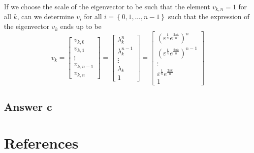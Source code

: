 \documentclass{article}
\theoremstyle{remark}
\begin{document}
    If we choose the scale of the eigenvector to be such that the element $v_{k,n} = 1$ for all $k$,  can we determine $v_{i}$ for all $i = \left\{ 0,1, \ldots, n-1 \right\}$ such that the expression of the eigenvector $v_k$ ends up to be \[
    v_k=  \begin{bmatrix} 
      v_{k,0} \\
      v_{k,1} \\
      \vdots  \\
      v_{k,n-1} \\
      v_{k,n} 
      \end{bmatrix} 
      = \begin{bmatrix} 
        \lambda_k ^{n} \\
        \lambda_k ^{n-1} \\
        \vdots  \\
        \lambda _k \\
        1
      \end{bmatrix} 
      = \begin{bmatrix} 
      \left( \varepsilon ^{\frac{1}{n}} e^{\frac{2 \pi k}{n} } \right)^{n} \\
      \left( \varepsilon ^{\frac{1}{n}} e^{\frac{2 \pi k}{n} } \right)^{n-1} \\
      \vdots \\
\varepsilon ^{\frac{1}{n}} e^{\frac{2 \pi k}{n} } \\
      1
      \end{bmatrix} 
    \] 

\subsection{Answer c}%
\label{sub:answer_c}



\newpage
\section{References}%
\label{sec:references}



\end{document}
